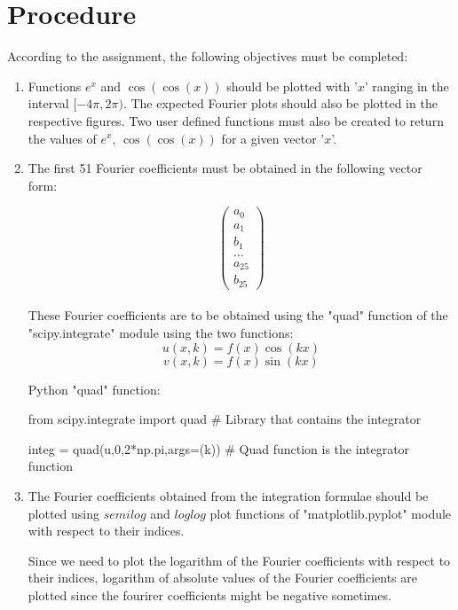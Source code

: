 \documentclass[12pt, a4paper]{article}
\begin{document}
\section{Procedure}
According to the assignment, the following objectives must be completed:
\begin{enumerate}
    \item Functions $e^{x}$ and $\cos(\cos(x))$ should be plotted with '$x$' ranging in the
interval $[-4\pi ,2\pi )$. The expected Fourier plots should also be plotted in the respective figures. Two user defined
functions must also be created to return the values of $e^{x}$, $\cos(\cos(x))$ for a given vector '$x$'.
    \item The first 51 Fourier coefficients must be obtained in the following vector form:

    \begin{equation*}
    \begin{pmatrix}
        a_{0} \\
        a_{1} \\
        b_{1} \\
        \ldots \\
        a_{25} \\
        b_{25}
    \end{pmatrix}
\end{equation*} \\
These Fourier coefficients are to be obtained using the "quad" function of the "scipy.integrate" module using
the two functions:
\begin{equation*}
    u(x,k) = f(x)\cos(kx)
\end{equation*}
\begin{equation*}
    v(x,k) = f(x)\sin(kx)
\end{equation*}

Python "quad" function:
\begin{psudo}
    from scipy.integrate import quad
    # Library that contains the integrator

    integ = quad(u,0,2*np.pi,args=(k))
    # Quad function is the integrator function
\end{psudo}

\vspace{0.4cm}
    \item The Fourier coefficients obtained from the integration formulae should be plotted using
$semilog$ and $loglog$ plot functions of "matplotlib.pyplot" module with respect to their indices.

Since we need to plot the logarithm of the Fourier coefficients with respect to their indices, logarithm of absolute values of the Fourier
coefficients are plotted since the fourirer coefficients might be negative sometimes.
\clearpage


\end{enumerate}
\end{document}
